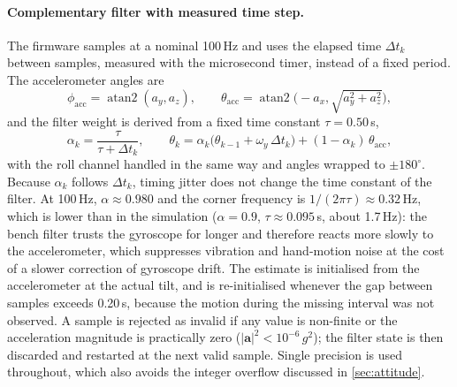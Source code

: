 \documentclass[11pt,a4paper]{article}
\newcommand{\vect}[1]{\bm{#1}}
\begin{document}
\paragraph{Complementary filter with measured time step.} The firmware samples at a nominal 100\,Hz and uses the elapsed time $\Delta t_k$ between samples, measured with the microsecond timer, instead of a fixed period. The accelerometer angles are
\begin{equation}
\phi_{\mathrm{acc}}=\operatorname{atan2}(a_y,a_z),\qquad
\theta_{\mathrm{acc}}=\operatorname{atan2}\!\bigl(-a_x,\sqrt{a_y^2+a_z^2}\bigr),
\end{equation}
and the filter weight is derived from a fixed time constant $\tau=0.50$\,s,
\begin{equation}
\alpha_k=\frac{\tau}{\tau+\Delta t_k},\qquad
\theta_k=\alpha_k\bigl(\theta_{k-1}+\omega_y\,\Delta t_k\bigr)+(1-\alpha_k)\,\theta_{\mathrm{acc}},
\label{eq:cfbench}
\end{equation}
with the roll channel handled in the same way and angles wrapped to $\pm180^\circ$. Because $\alpha_k$ follows $\Delta t_k$, timing jitter does not change the time constant of the filter. At 100\,Hz, $\alpha\approx0.980$ and the corner frequency is $1/(2\pi\tau)\approx0.32$\,Hz, which is lower than in the simulation ($\alpha=0.9$, $\tau\approx0.095$\,s, about 1.7\,Hz): the bench filter trusts the gyroscope for longer and therefore reacts more slowly to the accelerometer, which suppresses vibration and hand-motion noise at the cost of a slower correction of gyroscope drift. The estimate is initialised from the accelerometer at the actual tilt, and is re-initialised whenever the gap between samples exceeds 0.20\,s, because the motion during the missing interval was not observed. A sample is rejected as invalid if any value is non-finite or the acceleration magnitude is practically zero ($|\vect a|^2<10^{-6}\,g^2$); the filter state is then discarded and restarted at the next valid sample. Single precision is used throughout, which also avoids the integer overflow discussed in \cref{sec:attitude}.
 
\end{document}
